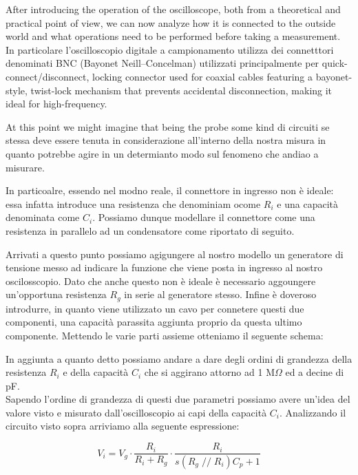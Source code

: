 \documentclass[../main.tex]{subfiles}
\begin{document}
After introducing the operation of the oscilloscope, both from a theoretical and practical point of view, we can now analyze how it is connected to the outside world and what operations need to be performed before taking a measurement.\\

In particolare l'oscilloscopio digitale a campionamento utilizza dei connetttori denominati BNC (Bayonet Neill–Concelman) utilizzati principalmente per quick-connect/disconnect, locking connector used for coaxial cables featuring a bayonet-style, twist-lock mechanism that prevents accidental disconnection, making it ideal for high-frequency. 

At this point we might imagine that being the probe some kind di circuiti se stessa deve essere tenuta in considerazione all'interno della nostra misura in quanto potrebbe agire in un determianto modo sul fenomeno che andiao a misurare.

In particoalre, essendo nel modno reale, il connettore in ingresso non è ideale: essa infatta introduce una resistenza che denominiam ocome $R_i$ e una capacità denominata come $C_i$. Possiamo dunque modellare il connettore come una resistenza in parallelo ad un condensatore come riportato di seguito.


Arrivati a questo punto possiamo agigungere al nostro modello un generatore di tensione messo ad indicare la funzione che viene posta in ingresso al nostro oscilosscopio. Dato che anche questo non è ideale è necessario aggoungere un'opportuna resistenza $R_g$ in serie al generatore stesso. Infine è doveroso introdurre, in quanto viene utilizzato un cavo per connetere questi due componenti, una capacità parassita aggiunta proprio da questa ultimo componente. Mettendo le varie parti assieme otteniamo il seguente schema:


In aggiunta a quanto detto possiamo andare a dare degli ordini di grandezza della resistenza $R_i$ e della capacità $C_i$ che si aggirano attorno ad 1 M$\Omega$ ed a decine di pF.\\

Sapendo l'ordine di grandezza di questi due parametri possiamo avere un'idea del valore visto e misurato dall'oscilloscopio ai capi della capacità $C_i$.
Analizzando il circuito visto sopra arriviamo alla seguente espressione:

\[ V_i = V_g \cdot \frac{R_i}{R_i + R_g} \cdot \frac{R_i}{s(R_g \;//\; R_i)C_p + 1}\]\
\end{document}
